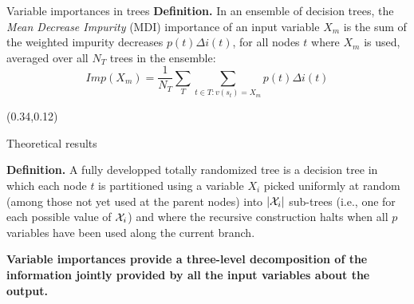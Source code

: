 \documentclass[final]{beamer}
\newcommand{\cmark}{\ding{51}}%
\begin{document}
\begin{frame}{}
\begin{textblock}{0.32}
\begin{block}{Variable importances in trees \phantom{p}}
\textbf{Definition.} In an ensemble of decision trees, the \textit{Mean
Decrease Impurity} (MDI) importance of an input variable $X_m$ is the
sum of the weighted impurity decreases $p(t)\Delta i(t)$, for all nodes $t$
where $X_m$ is used, averaged over all $N_T$ trees in the ensemble:
\begin{equation*}\label{eq:mdi}
Imp(X_m) = \frac{1}{N_T} \sum_{T} \sum_{t \in T:v(s_t) = X_m} p(t) \Delta i(t)
\end{equation*}

\end{block}



\end{textblock}




\begin{textblock}{0.32}(0.34,0.12)

\begin{block}{Theoretical results \phantom{p}}

\textbf{Definition.} A fully developped  totally randomized tree is a decision tree in which each node $t$ is
partitioned using a variable $X_i$ picked uniformly at random (among those not
yet used at the parent nodes) into $|{\cal
X}_i|$ sub-trees (i.e., one for each possible value of ${\cal X}_i$) and where
the recursive construction halts when all $p$ variables have been
used along the current branch.

\vspace{0.3cm}

{\color{green} \cmark} \textbf{Variable importances provide a three-level decomposition
of the information jointly provided by all the input variables about the output.}

\vspace{0.3cm}


\end{block}
\end{textblock}
\end{frame}
\end{document}
